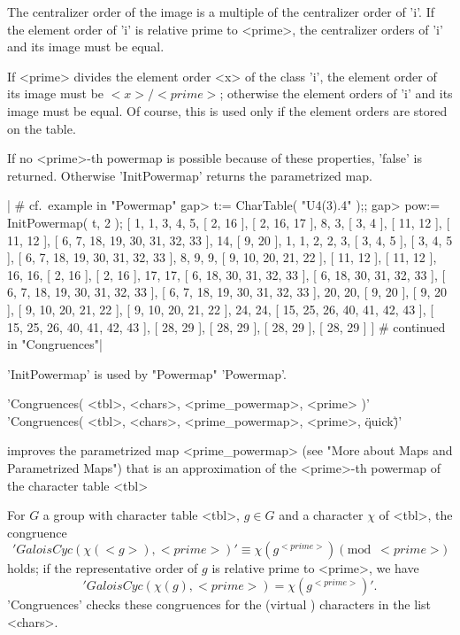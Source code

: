 The centralizer order of the image is a multiple of the centralizer order of
'i'. If the element order of 'i' is relative prime to <prime>, the
centralizer orders of 'i' and its image must be equal.

If <prime> divides the element order <x> of the class 'i', the element order
of its image must be $<x> / <prime>$; otherwise the element orders of 'i'
and its image must be equal. Of course, this is used only if the element
orders are stored on the table.

If no <prime>-th powermap is possible because of these properties, 'false' is
returned.  Otherwise 'InitPowermap' returns the parametrized map.

|    # cf.\ example in "Powermap"
    gap> t:= CharTable( "U4(3).4" );;
    gap> pow:= InitPowermap( t, 2 );
    [ 1, 1, 3, 4, 5, [ 2, 16 ], [ 2, 16, 17 ], 8, 3, [ 3, 4 ], 
      [ 11, 12 ], [ 11, 12 ], [ 6, 7, 18, 19, 30, 31, 32, 33 ], 14, 
      [ 9, 20 ], 1, 1, 2, 2, 3, [ 3, 4, 5 ], [ 3, 4, 5 ], 
      [ 6, 7, 18, 19, 30, 31, 32, 33 ], 8, 9, 9, [ 9, 10, 20, 21, 22 ], 
      [ 11, 12 ], [ 11, 12 ], 16, 16, [ 2, 16 ], [ 2, 16 ], 17, 17, 
      [ 6, 18, 30, 31, 32, 33 ], [ 6, 18, 30, 31, 32, 33 ], 
      [ 6, 7, 18, 19, 30, 31, 32, 33 ], [ 6, 7, 18, 19, 30, 31, 32, 33 ], 
      20, 20, [ 9, 20 ], [ 9, 20 ], [ 9, 10, 20, 21, 22 ], 
      [ 9, 10, 20, 21, 22 ], 24, 24, [ 15, 25, 26, 40, 41, 42, 43 ], 
      [ 15, 25, 26, 40, 41, 42, 43 ], [ 28, 29 ], [ 28, 29 ], [ 28, 29 ], 
      [ 28, 29 ] ]
    # continued in "Congruences"|

'InitPowermap' is used by "Powermap" 'Powermap'.


'Congruences( <tbl>, <chars>, <prime\_powermap>, <prime> )'\\
'Congruences( <tbl>, <chars>, <prime\_powermap>, <prime>, \"quick\" )'

improves the parametrized map <prime\_powermap> (see "More about Maps and
Parametrized Maps") that is an approximation of the <prime>-th powermap of the
character table <tbl>\:

For $G$ a group with character table <tbl>, $g \in G$ and a character $\chi$
of <tbl>, the congruence
\['GaloisCyc( \chi(<g>), <prime> )' \equiv\chi(g^{<prime>})\pmod{<prime>}\]
holds; if the representative order of $g$ is relative prime to <prime>, we
have
\['GaloisCyc( \chi(g), <prime> ) = \chi(g^{<prime>})'.\]
'Congruences' checks these congruences for the (virtual ) characters in the
list <chars>.

